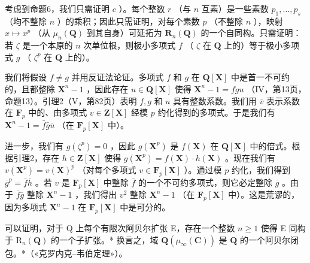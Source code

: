 考虑到命题6，我们只需证明 \(c\) ）。每个整数 \(r\) （与 \(n\) 互素）是一些素数 \(p_1, \ldots, p_s\) （均不整除 \(n\) ）的乘积；因此只需证明，对每个素数 \(p\) （不整除 \(n\) ），映射 \(x \mapsto x^p\) （从 \(\mu_n(\mathbf{Q})\) 到其自身）可延拓为 \(\mathbf{R}_n(\mathbf{Q})\) 的一个自同构。只需证明：若 \(\zeta\) 是一个本原的 \(n\) 次单位根，则极小多项式 \(f\) （ \(\zeta\) 在 \(\mathbf{Q}\) 上的）等于极小多项式 \(g\) （ \(\zeta^p\) 在 \(\mathbf{Q}\) 上的）。

我们将假设 \(f \neq g\) 并用反证法论证。多项式 \(f\) 和 \(g\) 在 \(\mathbf{Q}[\mathbf{X}]\) 中是首一不可约的，且都整除 \(\mathbf{X}^n - 1\) ，因此存在 \(u \in \mathbf{Q}[\mathbf{X}]\) 使得 \(\mathbf{X}^n - 1 = fgu\) （IV，第13页，命题13）。引理2（V，第82页）表明 \(f, g\) 和 \(u\) 具有整数系数。我们用 \(\bar{v}\) 表示系数在 \(\mathbf{F}_p\) 中的、由多项式 \(v \in \mathbf{Z}[\mathbf{X}]\) 经模 \(p\) 约化得到的多项式。于是我们有 \(\mathbf{X}^n - 1 = \bar{f}\bar{g}\bar{u}\) （在 \(\mathbf{F}_p[\mathbf{X}]\) 中）。

进一步，我们有 \(g(\zeta^p) = 0\) ，因此 \(g(\mathbf{X}^p)\) 是 \(f(\mathbf{X})\) 在 \(\mathbf{Q}[\mathbf{X}]\) 中的倍式。根据引理2，存在 \(h \in \mathbf{Z}[\mathbf{X}]\) 使得 \(g(\mathbf{X}^p) = f(\mathbf{X}) \cdot h(\mathbf{X})\) 。现在我们有 \(v(\mathbf{X}^p) = v(\mathbf{X})^p\) （对每个多项式 \(v \in \mathbf{F}_p[\mathbf{X}]\) ）。通过模 \(p\) 约化，我们得到 \(\overline{g}^p = \overline{f}\overline{h}\) 。若 \(v\) 是 \(\mathbf{F}_p[\mathbf{X}]\) 中整除 \(\overline{f}\) 的一个不可约多项式，则它必定整除 \(\overline{g}\) 。由于 \(\overline{f}\overline{g}\) 整除 \(\mathbf{X}^n - 1\) ，我们得出 \(v^2\) 整除 \(\mathbf{X}^n - 1\) （在 \(\mathbf{F}_p[\mathbf{X}]\) 中）。这是荒谬的，因为多项式 \(\mathbf{X}^n - 1\) 在 \(\mathbf{F}_p[\mathbf{X}]\) 中是可分的。

可以证明，对于 Q 上每个有限次阿贝尔扩张 E，存在一个整数 \(n \geqslant 1\) 使得 E 同构于 \(\mathrm{R}_{n}(\mathbf{Q})\) 的一个子扩张。* 换言之，域 \(\mathbf{Q}(\mu_{\infty}(\mathbf{C}))\) 是 \(\mathbf{Q}\) 的一个阿贝尔闭包。*（«克罗内克–韦伯定理»）。

